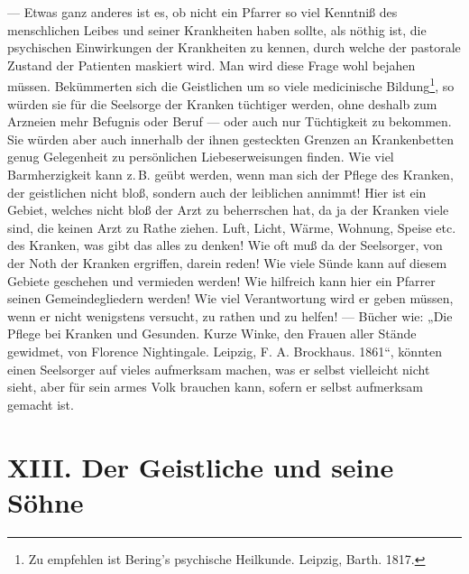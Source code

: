 — Etwas ganz anderes ist es, ob nicht ein Pfarrer so viel Kenntniß des menschlichen Leibes und seiner Krankheiten haben sollte, als nöthig ist, die psychischen Einwirkungen der Krankheiten zu kennen, durch welche der pastorale
Zustand der Patienten maskiert wird. Man wird diese Frage wohl bejahen müssen. Bekümmerten sich die Geistlichen um so viele medicinische Bildung\footnote{Zu empfehlen ist Bering’s psychische Heilkunde. Leipzig, Barth. 1817.}, so würden sie für die Seelsorge der Kranken tüchtiger werden, ohne deshalb zum Arzneien mehr Befugnis oder Beruf — oder auch nur Tüchtigkeit zu bekommen. Sie würden aber auch innerhalb der ihnen gesteckten Grenzen an Krankenbetten genug Gelegenheit zu persönlichen Liebeserweisungen finden. Wie viel Barmherzigkeit kann z.\,B. geübt werden, wenn man sich der Pflege des Kranken, der geistlichen nicht bloß, sondern auch der leiblichen annimmt! Hier ist ein Gebiet, welches nicht bloß der Arzt zu beherrschen hat, da ja der Kranken viele sind, die keinen Arzt zu Rathe ziehen. Luft, Licht, Wärme, Wohnung, Speise etc. des Kranken, was gibt das alles zu denken! Wie oft muß da der Seelsorger, von der Noth der Kranken ergriffen, darein reden! Wie viele Sünde kann auf diesem Gebiete geschehen und vermieden werden! Wie hilfreich kann hier ein Pfarrer seinen Gemeindegliedern werden! Wie viel Verantwortung wird er geben müssen, wenn er nicht wenigstens versucht, zu rathen und zu helfen! — Bücher wie: „Die Pflege bei Kranken und Gesunden. Kurze Winke, den Frauen aller Stände gewidmet, von Florence Nightingale. Leipzig, F. A. Brockhaus. 1861“, könnten einen Seelsorger auf vieles aufmerksam machen, was er selbst vielleicht nicht sieht, aber für sein armes Volk brauchen kann, sofern er selbst aufmerksam gemacht ist.

\section{XIII. Der Geistliche und seine Söhne}

